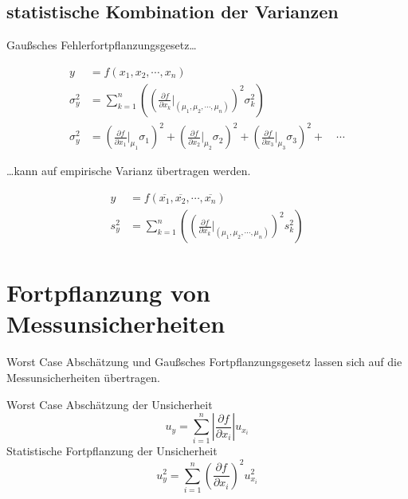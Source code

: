 \subsection*{statistische Kombination der Varianzen}
Gaußsches Fehlerfortpflanzungsgesetz\ldots

\begin{align*}
	y &= f\left( x_1, x_2, \cdots, x_n  \right)\\
	\sigma_{y}^{2} &= \sum_{k = 1}^{n} \left( \left( \frac{\partial f}{\partial
	x_k} \biggr|_{\left( \mu_1, \mu_2, \cdots, \mu_n \right)} \right)^2
	\sigma_{k}^{2} \right)
	\\
	\sigma_{y}^{2} &= 
	\left( \frac{\partial f}{\partial x_1} \biggr|_{\mu_1} \sigma_{1} \right)^2 + 
	\left( \frac{\partial f}{\partial x_2} \biggr|_{\mu_2} \sigma_{2} \right)^2 + 
	\left( \frac{\partial f}{\partial x_3} \biggr|_{\mu_3} \sigma_{3} \right)^2 +
	\quad \cdots
\end{align*}

\ldots kann auf empirische Varianz übertragen werden.

\begin{align*}
	y &= f\left( \overline{x_1}, \overline{x_2}, \cdots, \overline{x_n} \right)\\
	s_{y}^{2} &= \sum_{k = 1}^{n} \left( \left( \frac{\partial f}{\partial
	\overline{x_k}} \biggr|_{\left( \mu_1, \mu_2, \cdots, \mu_n \right)} \right)^2
	s_{k}^{2} \right)
\end{align*}

\newpage
\section{Fortpflanzung von Messunsicherheiten}
Worst Case Abschätzung und Gaußsches Fortpflanzungsgesetz lassen sich auf die
Messunsicherheiten übertragen.

\begin{multicols}{2}
	Worst Case Abschätzung der Unsicherheit
	\[
	u_y = \sum_{i = 1}^{n} \left| \frac{\partial f}{\partial x_i} \right| u_{x_i}
	\]
	Statistische Fortpflanzung der Unsicherheit
	\[
	u_{y}^{2} = \sum_{i = 1}^{n} \left( \frac{\partial f}{\partial x_i} \right)^2
	u_{x_i}^{2}
	\]
\end{multicols}